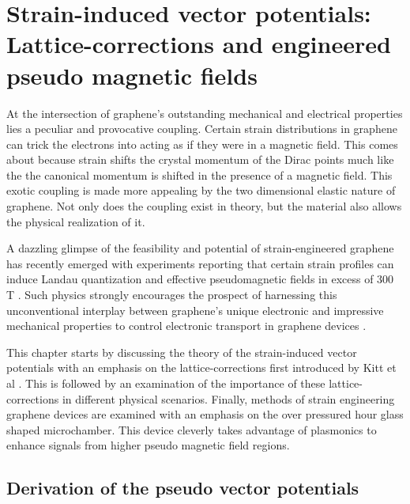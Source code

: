 \chapter{Strain-induced vector potentials: Lattice-corrections and engineered pseudo magnetic fields\label{chap:PVP}}

At the intersection of graphene's outstanding mechanical and electrical properties lies a peculiar and provocative coupling.
Certain strain distributions in graphene can trick the electrons into acting as if they were in a magnetic field.
This comes about because strain shifts the crystal momentum of the Dirac points much like the the canonical momentum is shifted in the presence of a magnetic field.
This exotic coupling is made more appealing by the two dimensional elastic nature of graphene.
Not only does the coupling exist in theory, but the material also allows the physical realization of it.

A dazzling glimpse of the feasibility and potential of strain-engineered graphene \cite{Pereira2009a,Guinea2009} has recently emerged with experiments reporting that certain strain profiles can induce Landau quantization and effective pseudomagnetic fields in excess of 300 T \cite{Levy2010,Yan2012,Yeh2011}.
Such physics strongly encourages the prospect of harnessing this unconventional interplay between graphene's unique electronic and impressive mechanical properties to control electronic transport in graphene devices \cite{Pereira2009a,Fogler2008}.

This chapter starts by discussing the theory of the strain-induced vector potentials with an emphasis on the lattice-corrections first introduced by Kitt et al \cite{Kitt2012,Kitt2013}.
This is followed by an examination of the importance of these lattice-corrections in different physical scenarios.
Finally, methods of strain engineering graphene devices are examined with an emphasis on the over pressured hour glass shaped microchamber.
This device cleverly takes advantage of plasmonics to enhance signals from higher pseudo magnetic field regions.

\section{Derivation of the pseudo vector potentials}

